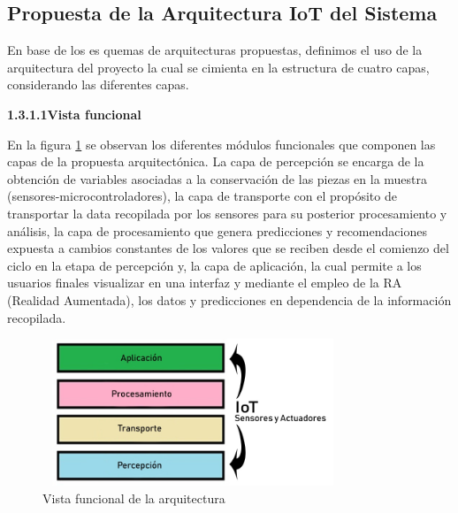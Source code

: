     \subsection{Propuesta de la Arquitectura IoT del Sistema}

    En base de los es quemas de arquitecturas propuestas, definimos el uso de la arquitectura del proyecto la cual se cimienta en la estructura de cuatro capas, considerando las diferentes capas.\\
    
        \textbf{1.3.1.1\hspace{5mm}Vista funcional}

    En la figura \ref{imag:vista_funcional_arquitectura_iot} se observan los diferentes módulos funcionales que componen las capas de la propuesta arquitectónica. La capa de percepción se encarga de la obtención de variables asociadas a la conservación de las piezas en la muestra (sensores-microcontroladores), la capa de transporte con el propósito de transportar la data recopilada por los sensores para su posterior procesamiento y análisis, la capa de procesamiento que genera predicciones y recomendaciones expuesta a cambios constantes de los valores que se reciben desde el comienzo del ciclo en la etapa de percepción y, la capa de aplicación, la cual permite a los usuarios finales visualizar en una interfaz y mediante el empleo de la RA (Realidad Aumentada), los datos y predicciones en dependencia de la información recopilada.\\

    \begin{figure}[h]
        \hspace{5cm}
        \includegraphics[width=9cm, height=4.4cm]{imagenes/myArquitecture2.jpg}
        \caption{Vista funcional de la arquitectura}
        \label{imag:vista_funcional_arquitectura_iot}
    \end{figure}

